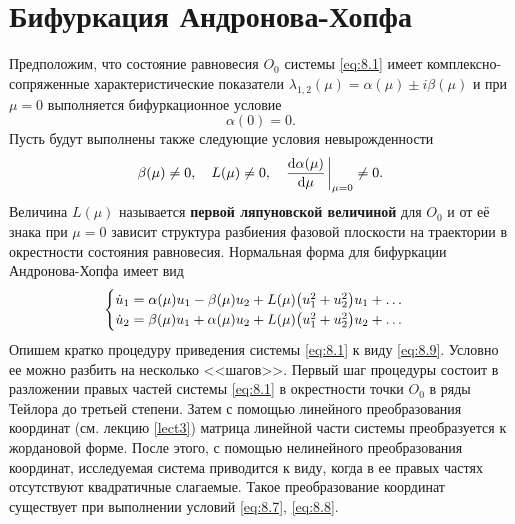 \section{Бифуркация Андронова-Хопфа}%
\label{sec:8.3}

Предположим, что состояние равновесия $O_0$ системы \eqref{eq:8.1} имеет комплексно-сопряженные характеристические 
показатели $\lambda_{1,2}(\mu) = \alpha(\mu) \pm i \beta(\mu)$ и при $\mu=0$ 
выполняется бифуркационное условие
\begin{equation}
        \label{eq:8.7}
        \alpha(0) = 0.
\end{equation}
Пусть будут выполнены также следующие условия невырожденности
\begin{equation}
        \label{eq:8.8}
        \beta(\mu) \neq 0,\quad L(\mu) \neq 0,\quad \dv{\alpha(\mu)}{\mu} \eval_{\mu=0} \neq 0.
\end{equation}
Величина $L(\mu)$ называется \textbf{первой ляпуновской величиной} для $O_0$ и от её знака
при $\mu=0$ зависит структура разбиения фазовой плоскости на траектории в
окрестности состояния равновесия. Нормальная форма для бифуркации
Андронова-Хопфа имеет вид
\begin{equation}
        \label{eq:8.9}
        \begin{cases}
                \dot u_1 = \alpha(\mu) u_1 -\beta(\mu) u_2 + L(\mu)\qty(u_1^2+u_2^2) u_1+\dots\\
                \dot u_2= \beta(\mu) u_1 +\alpha(\mu) u_2 + L(\mu)\qty(u_1^2+u_2^2) u_2 +\dots
        \end{cases}
\end{equation}
Опишем кратко процедуру приведения системы \eqref{eq:8.1} к виду \eqref{eq:8.9}. Условно ее
можно разбить на несколько <<шагов>>. Первый шаг процедуры состоит в
разложении правых частей системы \eqref{eq:8.1} в окрестности точки $O_0$ в ряды
Тейлора до третьей степени. Затем с помощью линейного преобразования
координат (см. лекцию \ref{lect3}) матрица линейной части системы преобразуется к
жордановой форме. После этого, с помощью нелинейного преобразования
координат, исследуемая система приводится к виду, когда в ее правых частях
отсутствуют квадратичные слагаемые. Такое преобразование координат
существует при выполнении условий \eqref{eq:8.7}, \eqref{eq:8.8}.

